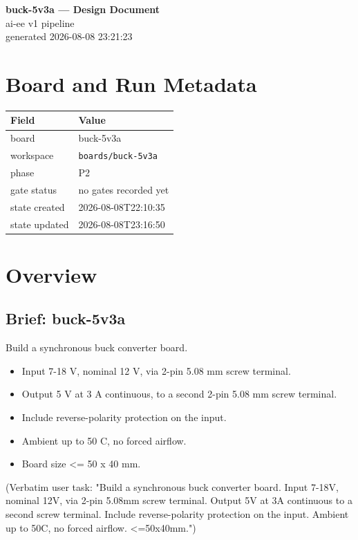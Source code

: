 \documentclass[11pt,a4paper]{article}
\begin{document}
\sloppy
\begin{center}
{\LARGE\bfseries buck-5v3a --- Design Document}\\[6pt]
{\large ai-ee v1 pipeline}\\[2pt]
generated 2026-08-08 23:21:23
\end{center}
\tableofcontents

\section{Board and Run Metadata}
{\small
\begin{longtable}{lp{11cm}}
\toprule
\textbf{Field} & \textbf{Value} \\
\midrule
\endhead
board & buck-5v3a \\
workspace & \texttt{boards/buck-5v3a} \\
phase & P2 \\
gate status & no gates recorded yet \\
state created & 2026-08-08T22:10:35 \\
state updated & 2026-08-08T23:16:50 \\
\bottomrule
\end{longtable}
}
\section{Overview}
\subsection*{Brief: buck-5v3a}
Build a synchronous buck converter board.

\begin{itemize}
\item Input 7-18 V, nominal 12 V, via 2-pin 5.08 mm screw terminal.
\item Output 5 V at 3 A continuous, to a second 2-pin 5.08 mm screw terminal.
\item Include reverse-polarity protection on the input.
\item Ambient up to 50 C, no forced airflow.
\item Board size \textless{}= 50 x 40 mm.
\end{itemize}
(Verbatim user task: "Build a synchronous buck converter board. Input 7-18V, nominal 12V, via 2-pin 5.08mm screw terminal. Output 5V at 3A continuous to a second screw terminal. Include reverse-polarity protection on the input. Ambient up to 50C, no forced airflow. \textless{}=50x40mm.")
\end{document}
